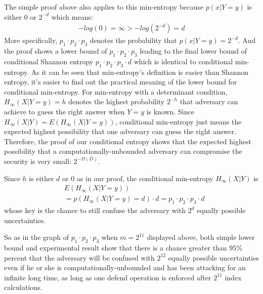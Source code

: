 \documentclass[10pt,a4paper]{article}
\begin{document}
	The simple proof above also applies to this min-entropy
	because $p(x | Y = y)$ is either $0$ or $2^{-d}$ which means:
	\begin{align*}
		-log(0) = \infty > -log(2^{-d}) = d
	\end{align*}
	More specifically,
	$p_1 \cdot p_2 \cdot p_3$ denotes the probability that $p(x | Y = y) = 2^{-d}$.
	And the proof shows a lower bound of $p_1 \cdot p_2 \cdot p_3$
	leading to the final lower bound of conditional Shannon entropy $p_1 \cdot p_2 \cdot p_3 \cdot d$
	which is identical to conditional min-entropy.
	As it can be seen that min-entropy's definition is easier than
	Shannon entropy, it's easier to find out the practical meaning of the lower
	bound for conditional min-entropy. For min-entropy with a determinant condition,
	$H_\infty(X | Y = y) = h$
	denotes the highest probability $2^{-h}$ that adversary can achieve to guess
	the right answer when $Y = y$ is known.
	Since $H_\infty(X | Y) = E\left(H_\infty(X | Y = y)\right)$,
	conditional min-entropy just means the expected highest
	possibility that one adversary can guess the right answer.
	Therefore, the proof of our conditional entropy shows that
	the expected highest possibility that a computationally-unbounded
	adversary can compromise the security is very small: $2^{-\Omega(D)}$.
	
	Since $h$ is either $d$ or $0$ as in our proof,
	the conditional min-entropy $H_\infty(X | Y)$
	is
	\begin{align*}
		&E\left(H_\infty(X | Y = y)\right)\\
		&=p\left(H_\infty(X | Y = y) = d\right) \cdot d = p_1 \cdot p_2 \cdot p_3 \cdot d
	\end{align*}
	whose key is the chance to still confuse the adversary with 
	$2^d$ equally possible uncertainties.
	
	So as in the graph of $p_1 \cdot p_2 \cdot p_3$ when 
	$m = 2^{11}$ displayed above, both simple lower
	bound and experimental result show that
	there is a chance greater than $95\%$ percent that the adversary
	will be confused with $2^{12}$ equally possible uncertainties
	even if he or she is computationally-unbounded and has been attacking
	for an infinite long time, as long as one defend operation is enforced
	after $2^{11}$ index calculations.
\end{document}
